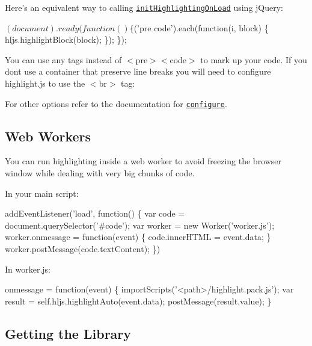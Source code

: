 Here’s an equivalent way to calling \href{http://highlightjs.readthedocs.io/en/latest/api.html#inithighlightingonload}{\tt {\ttfamily init\+Highlighting\+On\+Load}} using j\+Query\+:


\begin{DoxyCode}
$(document).ready(function() \{
  $('pre code').each(function(i, block) \{
    hljs.highlightBlock(block);
  \});
\});
\end{DoxyCode}


You can use any tags instead of {\ttfamily $<$pre$>$$<$code$>$} to mark up your code. If you don\textquotesingle{}t use a container that preserve line breaks you will need to configure highlight.\+js to use the {\ttfamily $<$br$>$} tag\+:




For other options refer to the documentation for \href{http://highlightjs.readthedocs.io/en/latest/api.html#configure-options}{\tt {\ttfamily configure}}.

\subsection*{Web Workers}

You can run highlighting inside a web worker to avoid freezing the browser window while dealing with very big chunks of code.

In your main script\+:


\begin{DoxyCode}
addEventListener('load', function() \{
  var code = document.querySelector('#code');
  var worker = new Worker('worker.js');
  worker.onmessage = function(event) \{ code.innerHTML = event.data; \}
  worker.postMessage(code.textContent);
\})
\end{DoxyCode}


In worker.\+js\+:


\begin{DoxyCode}
onmessage = function(event) \{
  importScripts('<path>/highlight.pack.js');
  var result = self.hljs.highlightAuto(event.data);
  postMessage(result.value);
\}
\end{DoxyCode}


\subsection*{Getting the Library}

